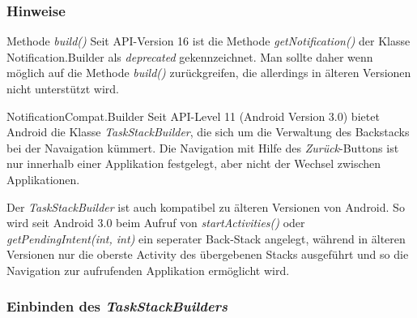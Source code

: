 \begin{frame}
   \frametitle{Hinweise}

   \begin{alertblock}{Methode \emph{build()}}
      Seit API-Version 16 ist die Methode \emph{getNotification()} der Klasse 
      Notification.Builder als \emph{deprecated} gekennzeichnet. Man sollte 
      daher wenn möglich auf die Methode \emph{build()} zurückgreifen, die 
      allerdings in älteren Versionen nicht unterstützt wird.
   \end{alertblock}

   \begin{alertblock}{NotificationCompat.Builder}
      Seit API-Level 11 (Android Version 3.0) bietet Android die Klasse 
      \emph{TaskStackBuilder}, die sich um die Verwaltung des Backstacks 
      bei der Navaigation kümmert. Die Navigation mit Hilfe des \emph{Zurück}-Buttons 
      ist nur innerhalb einer Applikation festgelegt, aber nicht der Wechsel zwischen 
      Applikationen.

      \vspace{3mm}

      Der \emph{TaskStackBuilder} ist auch kompatibel 
      zu älteren Versionen von Android. So wird seit Android 3.0 beim Aufruf von 
      \emph{startActivities()} oder \emph{getPendingIntent(int, int)} ein 
      seperater Back-Stack angelegt, während in älteren Versionen nur die oberste 
      Activity des übergebenen Stacks ausgeführt und so die Navigation zur aufrufenden 
      Applikation ermöglicht wird.
   \end{alertblock}
\end{frame}

\begin{frame}
   \frametitle{Einbinden des \emph{TaskStackBuilders}}

   
\end{frame}

